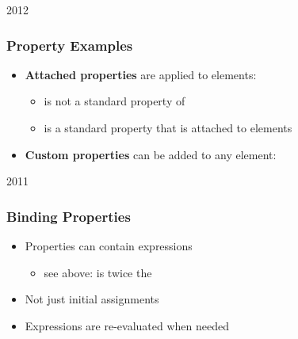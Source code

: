
\begin{slide}{2012}\frametitle{Property Examples}

\begin{itemize}
\item \textbf{Attached properties} are applied to elements:

\vspace*{0.25em}

\begin{itemize}
\item {} is not a standard property of 
\item is a standard property that is attached to elements
\end{itemize}

\vspace*{0.5em}
\item \textbf{Custom properties} can be added to any element:

\vspace*{0.25em}
\end{itemize}

\end{slide}



\begin{slide}{2011}\frametitle{Binding Properties}



\begin{itemize}
\item Properties can contain expressions
  \begin{itemize}
  \item see above:  is twice the 
  \end{itemize}
\item Not just initial assignments
\item Expressions are re-evaluated when needed
\end{itemize}

\end{slide}

